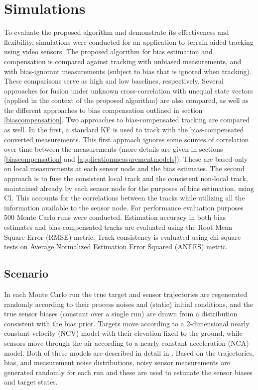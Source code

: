 \documentclass[journal]{IEEEtran}
\begin{document}
\section{Simulations} \label{application}
To evaluate the proposed algorithm and demonstrate its effectiveness and flexibility, simulations were conducted for an application to terrain-aided tracking using video sensors. The proposed algorithm for bias estimation and compensation is compared against tracking with unbiased measurements, and with bias-ignorant measurements (subject to bias that is ignored when tracking). These comparisons serve as high and low baselines, respectively. Several approaches for fusion under unknown cross-correlation with unequal state vectors (applied in the context of the proposed algorithm) are also compared, as well as the different approaches to bias compensation outlined in section \ref{biascompensation}. Two approaches to bias-compensated tracking are compared as well. In the first, a standard KF is used to track with the bias-compensated converted measurements. This first approach ignores some sources of correlation over time between the measurements (more details are given in sections \ref{biascompensation} and \ref{applicationmeasurementmodels}). These are based only on local measurements at each sensor node and the bias estimates. The second approach is to fuse the consistent local track and the consistent non-local track, maintained already by each sensor node for the purposes of bias estimation, using CI. This accounts for the correlations between the tracks while utilizing all the information available to the sensor node. For performance evaluation purposes 500 Monte Carlo runs were conducted. Estimation accuracy in both bias estimates and bias-compensated tracks are evaluated using the Root Mean Square Error (RMSE) metric. Track consistency is evaluated using chi-square tests on Average Normalized Estimation Error Squared (ANEES) metric.

\subsection{Scenario} \label{applicationscenario}
In each Monte Carlo run the true target and sensor trajectories are regenerated randomly according to their process noises and (static) initial conditions, and the true sensor biases (constant over a single run) are drawn from a distribution consistent with the bias prior. Targets move according to a 2-dimensional nearly constant velocity (NCV) model with their elevation fixed to the ground, while sensors move through the air according to a nearly constant acceleration (NCA) model. Both of these models are described in detail in \cite{bar2004estimation}. Based on the trajectories, bias, and measurement noise distributions, noisy sensor measurements are generated randomly for each run and these are used to estimate the sensor biases and target states.
\end{document}

